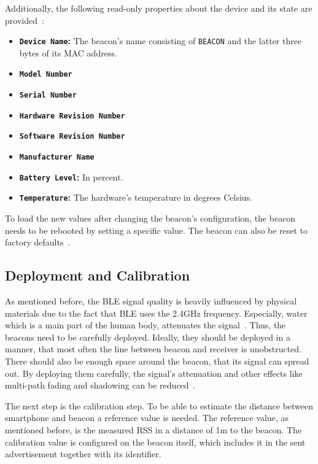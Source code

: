 \noindent Additionally, the following read-only properties about the device and its state are provided~\citep{binside:ds}:
\begin{itemize}
  \item \textbf{\texttt{Device Name}:} The beacon's name consisting of \texttt{BEACON} and the latter three bytes of its \acs{MAC} address.
  \item \textbf{\texttt{Model Number}}
  \item \textbf{\texttt{Serial Number}}
  \item \textbf{\texttt{Hardware Revision Number}}
  \item \textbf{\texttt{Software Revision Number}}
  \item \textbf{\texttt{Manufacturer Name}}
  \item \textbf{\texttt{Battery Level}:} In percent.
  \item \textbf{\texttt{Temperature}:} The hardware's temperature in degrees Celsius.
\end{itemize}

\noindent To load the new values after changing the beacon's configuration, the beacon needs to be rebooted by setting a specific value. The beacon can also be reset to factory defaults~\citep{binside:ds}.

\subsection{Deployment and Calibration}
As mentioned before, the \ac{BLE} signal quality is heavily influenced by physical materials due to the fact that \ac{BLE} uses the 2.4GHz frequency. Especially, water which is a main part of the human body, attenuates the signal~\citep{apple:getting_started}. Thus, the beacons need to be carefully deployed. Ideally, they should be deployed in a manner, that most often the line between beacon and receiver is unobstructed. There should also be enough space around the beacon, that its signal can spread out. By deploying them carefully, the signal's attenuation and other effects like multi-path fading and shadowing can be reduced~\citep{apple:getting_started,IEEE:survey_wireless_indoor_pos}.

The next step is the calibration step. To be able to estimate the distance between smartphone and beacon a reference value is needed. The reference value, as mentioned before, is the measured \ac{RSS} in a distance of 1m to the beacon. The calibration value is configured on the beacon itself, which includes it in the sent advertisement together with its identifier.

